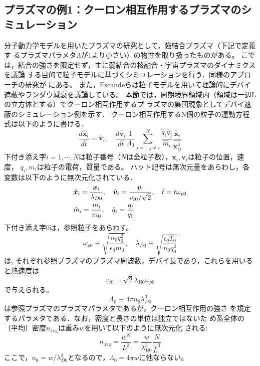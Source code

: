 \documentclass{jspf}            %
\renewcommand{\vec}[1]{\bm{#1}}
\begin{document}
\subsection{プラズマの例1：クーロン相互作用するプラズマのシミュレーション}
分子動力学モデルを用いたプラズマの研究として，強結合プラズマ（下記で定義す
るプラズマパラメタ$\Lambda$が1より小さい）の物性を取り扱ったものがある\cite{numata1}。
こでは，結合の強さを限定せず，主に弱結合の核融合・宇宙プラズマのダイナミクスを議論
する目的で粒子モデルに基づくシミュレーションを行う．同様のアプローチの研究が
\cite{numata2,numata3}にある。
また，Escandeらは粒子モデルを用いて理論的にデバイ遮蔽やランダウ減衰を議論している\cite{numata4}。
本節では，周期境界領域内（領域は一辺Lの立方体とする）でクーロン相互作用するプ
ラズマの集団現象としてデバイ遮蔽のシミュレーション例を示す．
クーロン相互作用するN個の粒子の運動方程式は以下のように書ける．
\begin{equation}
	\frac{d\hat{\vec{x}}_i}{d\hat{t}}=\hat{\vec{v}}_i,\quad
	\frac{d\hat{\vec{v}}_i}{d\hat{t}}\frac{1}{\Lambda_0}\sum_{j=1,j\neq i}^N\frac{\hat{q}_i\hat{q}_j}{\hat{m}_i}\frac{\hat{\vec{x}}_i}{\hat{\vec{x}^3_{ij}}}
\end{equation}
下付き添え字$i=1,\cdots,N$は粒子番号（$N$は全粒子数），$\vec{x}_i,\vec{v}_i$は粒子の位置，速度，
$q_i,m_i$は粒子の電荷，質量である。
ハット記号は無次元量をあらわし，各変数は以下のように無次元化されている．
\begin{align}
	& \hat{\vec{x}}_i = \frac{\vec{x}_i}{\lambda_{D0}},\quad\hat{\vec{v}}_i=\frac{\vec{v}_i}{v_{t0}/\sqrt{2}}, \quad\hat{t}=t\omega_{p0}\notag\\
	& \hat{m}_i=\frac{m_i}{m_0},\quad\hat{q}_i=\frac{q_i}{q_0}\notag
\end{align}
下付き添え字0は，参照粒子をあらわす。
\begin{equation}
	\omega_{p0}\equiv\sqrt{\frac{n_0q_0^2}{\epsilon_0m_0}},\quad\lambda_{D0}\equiv\sqrt{\frac{\epsilon_0T_0}{n_0q_0^2}}
\end{equation}
は, それぞれ参照プラズマのプラズマ周波数，デバイ長であり，これらを用いると熱速度は
\begin{equation}
	v_{t0}=\sqrt{2}\lambda_{D0}\omega_{p0}
\end{equation}
で与えられる。
\begin{equation}
	\Lambda_0\equiv4\pi n_0\lambda_{D0}^3
\end{equation}
は参照プラズマのプラズマパラメタであるが，クーロン相互作用の強さ
を規定するパラメタである．なお，密度と長さの単位は独立ではないた
め系全体の（平均）密度$n_{\mathrm{avg}}$は重み$w$を用いて以下のように無次元化
される: 
\begin{equation}
	n_{\mathrm{avg}}=\frac{w^N}{L^3}=\frac{w}{\lambda_{D0}^3}\frac{N}{\hat{L}^3}
\end{equation}
ここで，$n_0=w/\lambda_{D0}^3$となるので，$\Lambda_0=4\pi w$に他ならない。
\end{document}

